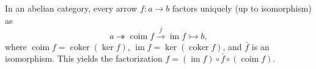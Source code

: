 In an abelian category, every arrow $f: a \rightarrow b$ factors uniquely (up to isomorphism) as
\[
a \twoheadrightarrow \operatorname{coim} f \xrightarrow{\bar{f}} \operatorname{im} f \rightarrowtail b,
\]
where $\operatorname{coim} f = \operatorname{coker}(\ker f)$, $\operatorname{im} f = \ker(\operatorname{coker} f)$, and $\bar{f}$ is an isomorphism. This yields the factorization $f = (\operatorname{im} f) \circ \bar{f} \circ (\operatorname{coim} f)$.
